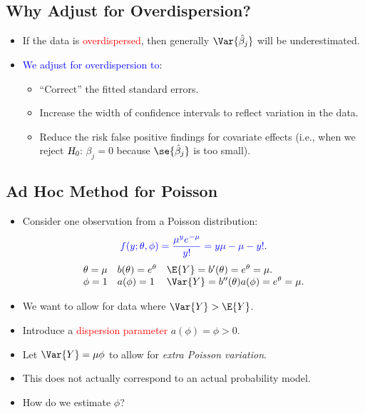 \documentclass{article}\usepackage[]{graphicx}\usepackage[svgnames]{xcolor}
\let\exp\relax%
\let\log\relax%
\newcommand{\HN}{\textsl{H}_{\textsl{0}}}%
\begin{document}
\subsection*{Why Adjust for Overdispersion?}
\begin{itemize}
      \item If the data is \textcolor{Red}{overdispersed}, then generally $ \Var{\hat{\beta}_j} $ will be underestimated.
      \item \textcolor{Blue}{We adjust for overdispersion to}:
            \begin{itemize}
                  \item ``Correct'' the fitted standard errors.
                  \item Increase the width of confidence intervals to reflect variation in the data.
                  \item Reduce the risk false positive findings for covariate effects (i.e., when we reject $ \HN $: $ \beta_j=0 $
                        because $ \se{\hat{\beta}_j} $ is too small).
            \end{itemize}
\end{itemize}
\subsection*{Ad Hoc Method for Poisson}
\begin{itemize}
      \item Consider one observation from a Poisson distribution:
            \[ \textcolor{Blue}{f(y;\theta,\phi)=\frac{\mu^y e^{-\mu}}{y!}=\exp{y\log{\mu}-\mu-\log{y!}}}. \]
            \[ \begin{array}{lll}
                        \theta=\log{\mu} & b(\theta)=e^{\theta} & \E{Y}=b^\prime(\theta)=e^{\theta}=\mu.                  \\
                        \phi=1           & a(\phi)=1            & \Var{Y}=b^{\prime\prime}(\theta)a(\phi)=e^{\theta}=\mu.
                  \end{array} \]
      \item We want to allow for data where $ \Var{Y}>\E{Y} $.
      \item Introduce a \textcolor{Red}{dispersion parameter} $ a(\phi)=\phi>0 $.
      \item Let $ \Var{Y}=\mu\phi $ to allow for \emph{extra Poisson variation}.
      \item This does not actually correspond to an actual probability model.
      \item How do we estimate $ \phi $?
\end{itemize}
\end{document}
